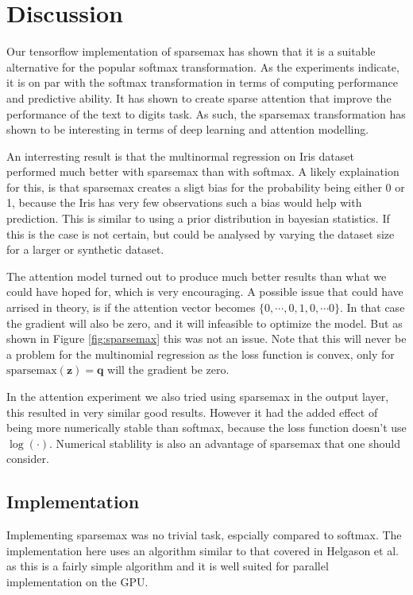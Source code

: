 \section{Discussion}
Our tensorflow implementation of sparsemax has shown that it is a suitable alternative for the popular softmax transformation. As the experiments indicate, it is on par with the softmax transformation in terms of computing performance and predictive ability.
It has shown to create sparse attention that improve the performance of the text to digits task. As such, the sparsemax transformation has shown to be interesting in terms of deep learning and attention modelling.

An interresting result is that the multinormal regression on Iris dataset performed much better with sparsemax than with softmax. A likely explaination for this, is that sparsemax creates a sligt bias for the probability being either 0 or 1, because the Iris has very few observations such a bias would help with prediction. This is similar to using a prior distribution in bayesian statistics. If this is the case is not certain, but could be analysed by varying the dataset size for a larger or synthetic dataset.

The attention model turned out to produce much better results than what we could have hoped for, which is very encouraging. A possible issue that could have arrised in theory, is if the attention vector becomes $\{0, \cdots, 0, 1, 0, \cdots 0\}$. In that case the gradient will also be zero, and it will infeasible to optimize the model. But as shown in Figure \ref{fig:sparsemax} this was not an issue. Note that this will never be a problem for the multinomial regression as the loss function is convex, only for $\mathrm{sparsemax}(\mathbf{z}) = \mathbf{q}$ will the gradient be zero.

In the attention experiment we also tried using sparsemax in the output layer, this resulted in very similar good results. However it had the added effect of being more numerically stable than softmax, because the loss function doesn't use $\log(\cdot)$. Numerical stablility is also an advantage of sparsemax that one should consider.

\subsection{Implementation}
Implementing sparsemax was no trivial task, espcially compared to softmax. The implementation here uses an algorithm similar to that covered in Helgason et al. \cite{Helgason1980} as this is a fairly simple algorithm and it is well suited for parallel implementation on the GPU.

